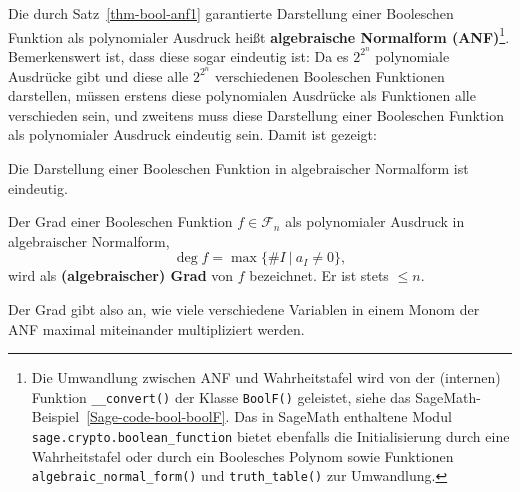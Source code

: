 \begin{refsegment}
Die durch Satz~\ref{thm-bool-anf1} garantierte Darstellung einer
Booleschen Funktion als polynomialer Ausdruck
heißt \textbf{algebraische
Normalform (ANF)}\footnote{%
   Die Umwandlung zwischen ANF und Wahrheitstafel
   wird von der (internen) Funktion {\tt \_\_convert()} der Klasse
   {\tt BoolF()} geleistet, siehe das SageMath-Beispiel~\ref{Sage-code-bool-boolF}.
   Das in SageMath enthaltene Modul {\tt sage.crypto.boolean\_function}
   bietet ebenfalls die Initialisierung durch eine Wahrheitstafel
   oder durch ein Boolesches Polynom sowie Funktionen
   {\tt algebraic\_normal\_form()}
   und {\tt truth\_table()} zur Umwandlung.
}. Bemerkenswert ist, dass diese sogar eindeutig ist:
Da es $2^{2^n}$ polynomiale Ausdrücke gibt und diese alle $2^{2^n}$
verschiedenen Booleschen Funktionen darstellen, müssen erstens diese
polynomialen Ausdrücke als Funktionen alle verschieden sein, und
zweitens muss diese Darstellung einer Booleschen Funktion als
polynomialer Ausdruck eindeutig sein. Damit ist gezeigt:

\begin{satz}\label{thm-bool-anf2}
   Die Darstellung einer Booleschen Funktion in algebraischer
    Normalform
   ist eindeutig.
\end{satz}

\begin{definition}
   Der Grad einer Booleschen
   Funktion $f \in \mathcal{F}_n$ als
   polynomialer Ausdruck in algebraischer Normalform,
\[
  \deg f = \max\{\#I \:|\: a_I \neq 0\},
\]
   wird als \textbf{(algebraischer) Grad} von $f$
   bezeichnet. Er ist stets $\leq n$.
\end{definition}

Der Grad gibt also an, wie viele verschiedene Variablen in einem
Monom der ANF
maximal miteinander multipliziert werden.


\end{refsegment}
